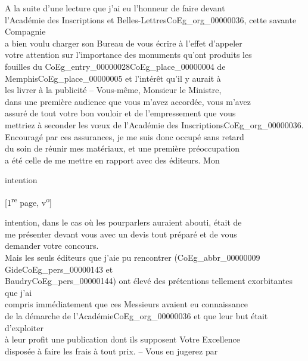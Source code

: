 \documentclass{book}
\begin{document}
\indent A la suite d’une lecture que j’ai eu l’honneur de faire devant\\
l’Académie des Inscriptions et Belles-Lettres\gls{CoEg_org_00000036}, cette savante Compagnie\\
a bien voulu charger son Bureau de vous écrire à l’effet d’appeler\\
votre attention sur l’importance des monuments qu’ont produits les\\
fouilles du \Gls{CoEg_entry_00000028}\gls{CoEg_place_00000004} de Memphis\gls{CoEg_place_00000005} et l’intérêt qu’il y aurait à\\
les livrer à la publicité – Vous-même, Monsieur le Ministre,\\
dans une première audience que vous m’avez accordée, vous m’avez\\
assuré de tout votre bon vouloir et de l’empressement que vous\\
mettriez à seconder les vœux de l’Académie des Inscriptions\gls{CoEg_org_00000036}.\\
\indent Encouragé par ces assurances, je me suis donc occupé sans retard\\
du soin de réunir mes matériaux, et une première préoccupation\\
a été celle de me mettre en rapport avec des éditeurs. Mon
\begin{flushright}intention\end{flushright}
{\footnotesize\begin{center} {[1\textsuperscript{re} page, v\textsuperscript{o}]}\end{center}}
intention, dans le cas où les pourparlers auraient abouti, était de\\
me présenter devant vous avec un devis tout préparé et de vous\\
demander votre concours.\\
\indent Mais les seuls éditeurs que j’aie pu rencontrer (\gls{CoEg_abbr_00000009} Gide\gls{CoEg_pers_00000143} et\\
Baudry\gls{CoEg_pers_00000144}) ont élevé des prétentions tellement exorbitantes que j’ai\\
compris immédiatement que ces Messieurs avaient eu connaissance\\
de la démarche de l’Académie\gls{CoEg_org_00000036} et que leur but était d’exploiter\\
à leur profit une publication dont ils supposent Votre Excellence\\
disposée à faire les frais à tout prix. – Vous en jugerez par\\
\end{document}

